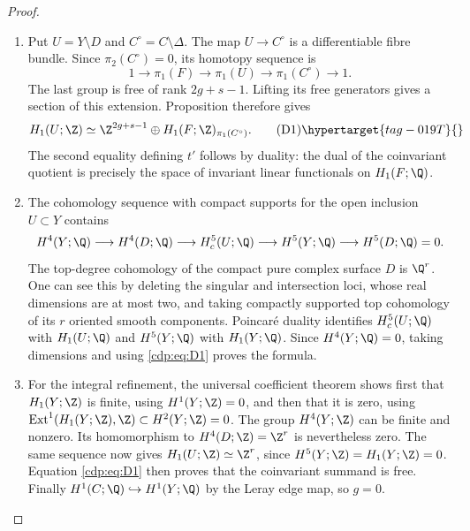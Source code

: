 \begin{proof}

\begin{enumerate}[label={$\langle1\rangle$\arabic*.},leftmargin=*]
\item Put $U=Y\setminus D$ and $C^\circ=C\setminus\Delta$.
The map $U\to C^\circ$ is a differentiable fibre bundle. Since
$\pi_2(C^\circ)=0$, its homotopy sequence is
\[
1\longrightarrow\pi_1(F)\longrightarrow\pi_1(U)
 \longrightarrow\pi_1(C^\circ)\longrightarrow1.
\]
The last group is free of rank $2g+s-1$. Lifting its free generators
gives a section of this extension. Proposition  therefore gives
\[
H_1(U;\Z)\simeq
\Z^{2g+s-1}\oplus H_1(F;\Z)_{\pi_1(C^\circ)}.       \tag{D1}\hypertarget{tag-019T}{}\label{cdp:eq:D1}
\]
The second equality defining $t'$ follows by duality: the dual of
the coinvariant quotient is precisely the space of invariant
linear functionals on $H_1(F;\Q)$.

\item The cohomology sequence with compact supports for the open inclusion
$U\subset Y$ contains
\[
H^4(Y;\Q)\longrightarrow H^4(D;\Q)
\longrightarrow H_c^5(U;\Q)
\longrightarrow H^5(Y;\Q)\longrightarrow H^5(D;\Q)=0.
\]
The top-degree cohomology of the compact pure complex surface $D$
is $\Q^r$. One can see this by deleting the singular and intersection
loci, whose real dimensions are at most two, and taking compactly
supported top cohomology of its $r$ oriented smooth components.
Poincar\'e duality identifies $H_c^5(U;\Q)$ with $H_1(U;\Q)$ and
$H^5(Y;\Q)$ with $H_1(Y;\Q)$. Since $H^4(Y;\Q)=0$, taking
dimensions and using \eqref{cdp:eq:D1} proves the formula.

\item For the integral refinement, the universal coefficient theorem shows
first that $H_1(Y;\Z)$ is finite, using $H^1(Y;\Z)=0$, and then that
it is zero, using
$\operatorname{Ext}^1(H_1(Y;\Z),\Z)\subset H^2(Y;\Z)=0$.
The group $H^4(Y;\Z)$ can be finite and nonzero. Its homomorphism
to $H^4(D;\Z)=\Z^r$ is nevertheless zero. The same sequence now
gives $H_1(U;\Z)\simeq\Z^r$, since $H^5(Y;\Z)=H_1(Y;\Z)=0$.
Equation \eqref{cdp:eq:D1} then proves that the coinvariant summand is free.
Finally $H^1(C;\Q)\hookrightarrow H^1(Y;\Q)$ by the Leray edge
map, so $g=0$.

\end{enumerate}
\end{proof}
